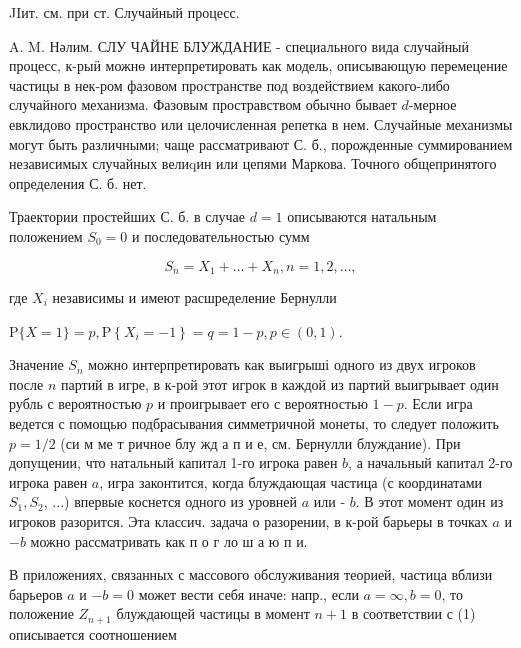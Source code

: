 \documentclass[10pt]{article}
\begin{document}
JIит. см. при ст. Случайный процесс.



A. M. Нәлим. СЛУ ЧАЙНЕ БЛУЖДАНИЕ - специального вида случайныӥ процесс, к-рыӥ можнө интерпретировать как модель, описывающую перемецение частицы в нек-ром фазовом пространстве под воздействием какого-либо случайного механизма. Фазовым простравством обычно бывает $d$-мерное евклидово пространство или целочисленная репетка в нем. Случайные механизмы могут быть различными; чаще рассматривают С. б., порожденные суммированием независимых случайных велиqин или цепями Маркова. Точного общепринятого определения С. б. нет.



Траектории простейших С. б. в случае $d=1$ описываются натальным положением $S_{0}=0$ и последовательностью сумм



\[

S_{n}=X_{1}+\ldots+X_{n}, n=1,2, \ldots,

\]



где $X_{i}$ независимы и имеют расшределение Бернулли



$\mathrm{P}\{X=1\}=p, \mathrm{P}\left\{X_{i}=-1\right\}=q=1-p, p \in(0,1)$.



Значение $S_{n}$ можно интерпретировать как выигрыші одного из двух игроков после $n$ партий в игре, в к-рой этот игрок в каждой из партий выигрывает один рубль с вероятностью $p$ и проигрывает его с вероятностью $1-p$. Если игра ведется с помощью подбрасывания симметричной монеты, то следует положить $p=1 / 2$ (си м ме т ричное блу жд а п и е, см. Бернулли блуждание). При допущении, что натальный капитал 1-го игрока равен $b$, а начальный капитал 2-го игрока равен $a$, игра законтится, когда блуждающая частица (с координатами $S_{1}, S_{2}$, ...) впервые коснется одного из уровней $a$ или - $b$. В этот момент один из игроков разорится. Эта классич. задача о разорении, в к-рой барьеры в точках $a$ и $-b$ можно рассматривать как п о г ло ш а ю п и.



В приложениях, связанных с массового обслуживания теорией, частица вблизи барьеров $a$ и $-b=0$ может вести себя иначе: напр., если $a=\infty, b=0$, то положение $Z_{n+1}$ блуждающей частицы в момент $n+1$ в соответствии с (1) описывается соотношением
\end{document}
